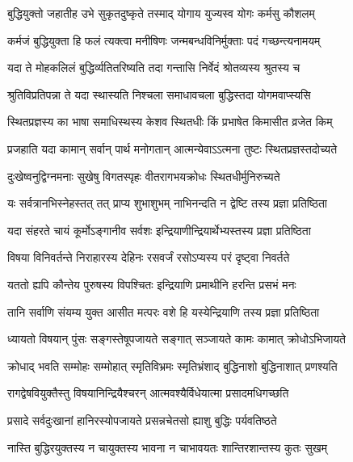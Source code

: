 \twolineshloka
{बुद्धियुक्तो जहातीह उभे सुकृतदुष्कृते}
{तस्माद् योगाय युज्यस्व योगः कर्मसु कौशलम्}%

\twolineshloka
{कर्मजं बुद्धियुक्ता हि फलं त्यक्त्वा मनीषिणः}
{जन्मबन्धविनिर्मुक्ताः पदं गच्छन्त्यनामयम्}%

\twolineshloka
{यदा ते मोहकलिलं बुद्धिर्व्यतितरिष्यति}
{तदा गन्तासि निर्वेदं श्रोतव्यस्य श्रुतस्य च}%

\twolineshloka
{श्रुतिविप्रतिपन्ना ते यदा स्थास्यति निश्चला}
{समाधावचला बुद्धिस्तदा योगमवाप्स्यसि}%


\twolineshloka
{स्थितप्रज्ञस्य का भाषा समाधिस्थस्य केशव}
{स्थितधीः किं प्रभाषेत किमासीत व्रजेत किम्}%


\twolineshloka
{प्रजहाति यदा कामान् सर्वान् पार्थ मनोगतान्}
{आत्मन्येवाऽऽत्मना तुष्टः स्थितप्रज्ञस्तदोच्यते}%

\twolineshloka
{दुःखेष्वनुद्विग्नमनाः सुखेषु विगतस्पृहः}
{वीतरागभयक्रोधः स्थितधीर्मुनिरुच्यते}%

\twolineshloka
{यः सर्वत्रानभिस्नेहस्तत् तत् प्राप्य शुभाशुभम्}
{नाभिनन्दति न द्वेष्टि तस्य प्रज्ञा प्रतिष्ठिता}%

\twolineshloka
{यदा संहरते चायं कूर्मोऽङ्गानीव सर्वशः}
{इन्द्रियाणीन्द्रियार्थेभ्यस्तस्य प्रज्ञा प्रतिष्ठिता}%

\twolineshloka
{विषया विनिवर्तन्ते निराहारस्य देहिनः}
{रसवर्जं रसोऽप्यस्य परं दृष्ट्वा निवर्तते}%

\twolineshloka
{यततो ह्यपि कौन्तेय पुरुषस्य विपश्चितः}
{इन्द्रियाणि प्रमाथीनि हरन्ति प्रसभं मनः}%

\twolineshloka
{तानि सर्वाणि संयम्य युक्त आसीत मत्परः}
{वशे हि यस्येन्द्रियाणि तस्य प्रज्ञा प्रतिष्ठिता}%

\twolineshloka
{ध्यायतो विषयान् पुंसः सङ्गस्तेषूपजायते}
{सङ्गात् सञ्जायते कामः कामात् क्रोधोऽभिजायते}%

\twolineshloka
{क्रोधाद् भवति सम्मोहः सम्मोहात् स्मृतिविभ्रमः}
{स्मृतिभ्रंशाद् बुद्धिनाशो बुद्धिनाशात् प्रणश्यति}%

\twolineshloka
{रागद्वेषवियुक्तैस्तु विषयानिन्द्रियैश्चरन्}
{आत्मवश्यैर्विधेयात्मा प्रसादमधिगच्छति}%

\twolineshloka
{प्रसादे सर्वदुःखानां हानिरस्योपजायते}
{प्रसन्नचेतसो ह्याशु बुद्धिः पर्यवतिष्ठते}%

\twolineshloka
{नास्ति बुद्धिरयुक्तस्य न चायुक्तस्य भावना}
{न चाभावयतः शान्तिरशान्तस्य कुतः सुखम्}%

